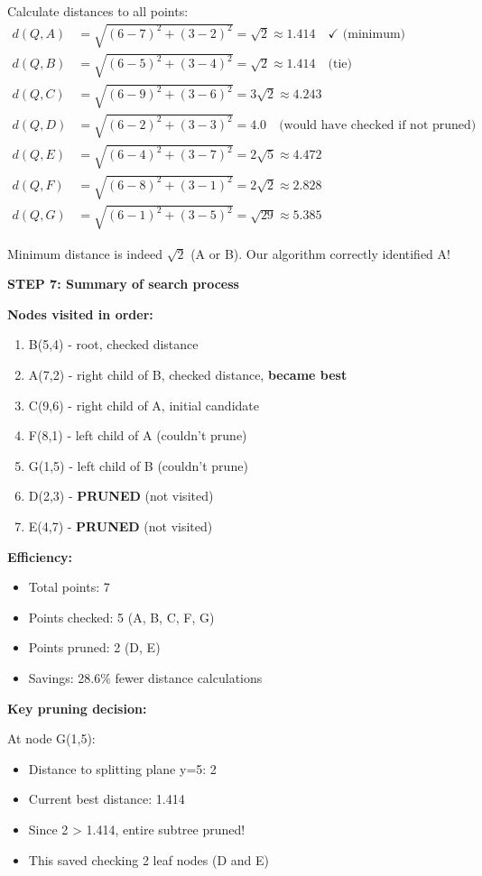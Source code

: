 \documentclass[12pt]{article}
\begin{document}
\begin{solution}
Calculate distances to all points:
\begin{align*}
d(Q, A) &= \sqrt{(6-7)^2 + (3-2)^2} = \sqrt{2} \approx 1.414 \quad \checkmark \text{ (minimum)} \\
d(Q, B) &= \sqrt{(6-5)^2 + (3-4)^2} = \sqrt{2} \approx 1.414 \quad \text{(tie)} \\
d(Q, C) &= \sqrt{(6-9)^2 + (3-6)^2} = 3\sqrt{2} \approx 4.243 \\
d(Q, D) &= \sqrt{(6-2)^2 + (3-3)^2} = 4.0 \quad \text{(would have checked if not pruned)} \\
d(Q, E) &= \sqrt{(6-4)^2 + (3-7)^2} = 2\sqrt{5} \approx 4.472 \\
d(Q, F) &= \sqrt{(6-8)^2 + (3-1)^2} = 2\sqrt{2} \approx 2.828 \\
d(Q, G) &= \sqrt{(6-1)^2 + (3-5)^2} = \sqrt{29} \approx 5.385
\end{align*}

Minimum distance is indeed $\sqrt{2}$ (A or B). Our algorithm correctly identified A!

\textbf{STEP 7: Summary of search process}

\textbf{Nodes visited in order:}
\begin{enumerate}
    \item B(5,4) - root, checked distance
    \item A(7,2) - right child of B, checked distance, \textbf{became best}
    \item C(9,6) - right child of A, initial candidate
    \item F(8,1) - left child of A (couldn't prune)
    \item G(1,5) - left child of B (couldn't prune)
    \item D(2,3) - \textbf{PRUNED} (not visited)
    \item E(4,7) - \textbf{PRUNED} (not visited)
\end{enumerate}

\textbf{Efficiency:}
\begin{itemize}
    \item Total points: 7
    \item Points checked: 5 (A, B, C, F, G)
    \item Points pruned: 2 (D, E)
    \item Savings: 28.6\% fewer distance calculations
\end{itemize}

\textbf{Key pruning decision:}

At node G(1,5):
\begin{itemize}
    \item Distance to splitting plane y=5: 2
    \item Current best distance: 1.414
    \item Since 2 > 1.414, entire subtree pruned!
    \item This saved checking 2 leaf nodes (D and E)
\end{itemize}


\end{solution}
\end{document}
